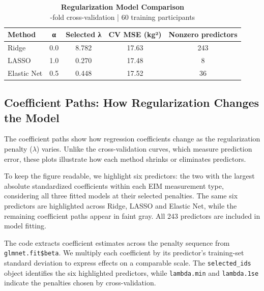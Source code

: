 \documentclass[
  letterpaper,
  DIV=11,
  numbers=noendperiod]{scrreprt}
\begin{document}
\begin{table}
\caption*{
{\fontsize{20}{25}\selectfont  \textbf{Regularization Model Comparison}\fontsize{10}{13}\selectfont } \\ 
{\fontsize{14}{17}-fold cross-validation | 60 training participants\fontsize{10}{13}\selectfont }
} 
\fontsize{10.0pt}{13.0pt}\selectfont
\begin{tabular*}{\linewidth}{@{\extracolsep{\fill}}lcccc}
\toprule
Method & α & Selected λ & CV MSE (kg²) & Nonzero predictors \\ 
\midrule\addlinespace[2.5pt]
Ridge & 0.0 & 8.782 & 17.63 & 243 \\ 
LASSO & 1.0 & 0.270 & 17.48 & 8 \\ 
Elastic Net & 0.5 & 0.448 & 17.52 & 36 \\ 
\bottomrule
\end{tabular*}
\end{table}

\subsection{Coefficient Paths: How Regularization Changes the
Model}\label{coefficient-paths-how-regularization-changes-the-model}

The coefficient paths show how regression coefficients change as the
regularization penalty (\(\lambda\)) varies. Unlike the cross-validation
curves, which measure prediction error, these plots illustrate how each
method shrinks or eliminates predictors.

To keep the figure readable, we highlight six predictors: the two with
the largest absolute standardized coefficients within each EIM
measurement type, considering all three fitted models at their selected
penalties. The same six predictors are highlighted across Ridge, LASSO
and Elastic Net, while the remaining coefficient paths appear in faint
gray. All 243 predictors are included in model fitting.

The code extracts coefficient estimates across the penalty sequence from
\texttt{glmnet.fit\$beta}. We multiply each coefficient by its
predictor's training-set standard deviation to express effects on a
comparable scale. The \texttt{selected\_ids} object identifies the six
highlighted predictors, while \texttt{lambda.min} and
\texttt{lambda.1se} indicate the penalties chosen by cross-validation.
\end{document}
